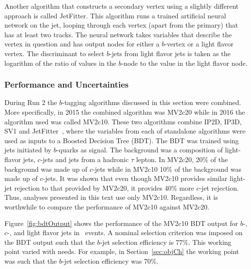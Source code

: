 \par Another algorithm that constructs a secondary vertex using a slightly different approach is 
called JetFitter. This algorithm runs a trained artificial neural network on 
the jet, looping through each vertex (apart from the primary)
that has at least two tracks. The neural network takes variables that describe the vertex in question 
and has output nodes for either a $b$-vertex or a light flavor vertex. The discriminant to select $b$-jets 
from light flavor jets is taken as the logarithm of the ratio of values in the $b$-node to the value 
in the light flavor node.     

\subsubsection{Performance and Uncertainties}
\par During Run 2 the $b$-tagging algorithms discussed in this section were combined. 
More specifically, in 2015 the combined algorithm was MV2c20 while in 2016 the algorithm used was called MV2c10.
These two algorithms combine IP2D, IP3D, SV1 and JetFitter~\cite{ATL-PHYS-PUB-2016-012}, where 
the variables from each of standalone algorithms were used as inputs to a Boosted Decision Tree (BDT). 
The BDT was trained using jets initiated by $b$-quarks as signal. The background was a composition of 
light-flavor jets, $c$-jets and jets from a hadronic $\tau$ lepton. In MV2c20, 20\% of the background was made up of  
$c$-jets while in MV2c10 10\% of the background was made up of $c$-jets. It was shown that even though MV2c10 
provides similar light-jet rejection to that provided by MV2c20, it provides 40\% more $c$-jet rejection. 
Thus, analyses presented in this text use only MV2c10. Regardless, it is worthwhile to compare 
the performance of MV2c10 against MV2c20.  

\par Figure~\ref{fig:bdtOutput} shows the performance of the MV2c10 BDT output for $b$-, $c$-, and 
light flavor jets in \ttbar\ events. A nominal selection criterion was imposed on the BDT output such that the 
$b$-jet selection efficiency is 77\%. This working point varied with needs. For example, in 
Section~\ref{sec:objCh} the working point was such that the $b$-jet selection efficiency was 70\%. 

